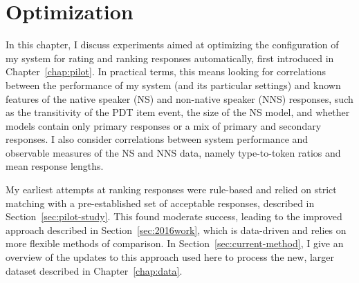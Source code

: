\chapter{Optimization}
\label{chap:optimization}
In this chapter, I discuss experiments aimed at optimizing the configuration of my system for rating and ranking responses automatically, first introduced in Chapter~\ref{chap:pilot}. In practical terms, this means looking for correlations between the performance of my system (and its particular settings) and known features of the native speaker (NS) and non-native speaker (NNS) responses, such as the transitivity of the PDT item event, the size of the NS model, and whether models contain only primary responses or a mix of primary and secondary responses. I also consider correlations between system performance and observable measures of the NS and NNS data, namely type-to-token ratios and mean response lengths.

My earliest attempts at ranking responses were rule-based and relied on strict matching with a pre-established set of acceptable responses, described in Section~\ref{sec:pilot-study}. This found moderate success, leading to the improved approach described in Section~\ref{sec:2016work}, which is data-driven and relies on more flexible methods of comparison.
In Section~\ref{sec:current-method}, I give an overview of the updates to this approach used here to process the new, larger dataset described in Chapter~\ref{chap:data}.

